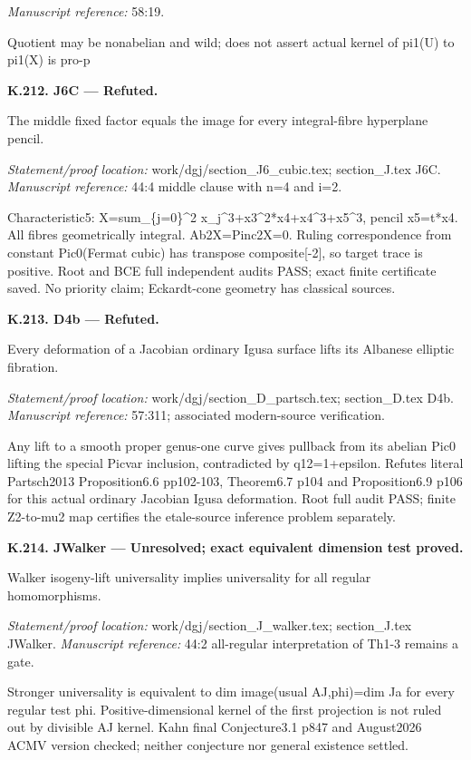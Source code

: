 \emph{Manuscript reference:} 58:19.
\par Quotient may be nonabelian and wild; does not assert actual kernel of pi1(U) to pi1(X) is pro-p
\par\medskip\noindent\textbf{K.212. J6C --- Refuted.}\par
The middle fixed factor equals the image for every integral-fibre hyperplane pencil.
\par\emph{Statement/proof location:} work/dgj/section\_J6\_cubic.tex; section\_J.tex J6C.
\emph{Manuscript reference:} 44:4 middle clause with n=4 and i=2.
\par Characteristic5: X=sum\_\{j=0\}\textasciicircum{}2 x\_j\textasciicircum{}3+x3\textasciicircum{}2*x4+x4\textasciicircum{}3+x5\textasciicircum{}3, pencil x5=t*x4. All fibres geometrically integral. Ab2X=Pinc2X=0. Ruling correspondence from constant Pic0(Fermat cubic) has transpose composite[-2], so target trace is positive. Root and BCE full independent audits PASS; exact finite certificate saved. No priority claim; Eckardt-cone geometry has classical sources.
\par\medskip\noindent\textbf{K.213. D4b --- Refuted.}\par
Every deformation of a Jacobian ordinary Igusa surface lifts its Albanese elliptic fibration.
\par\emph{Statement/proof location:} work/dgj/section\_D\_partsch.tex; section\_D.tex D4b.
\emph{Manuscript reference:} 57:311; associated modern-source verification.
\par Any lift to a smooth proper genus-one curve gives pullback from its abelian Pic0 lifting the special Picvar inclusion, contradicted by q12=1+epsilon. Refutes literal Partsch2013 Proposition6.6 pp102-103, Theorem6.7 p104 and Proposition6.9 p106 for this actual ordinary Jacobian Igusa deformation. Root full audit PASS; finite Z2-to-mu2 map certifies the etale-source inference problem separately.
\par\medskip\noindent\textbf{K.214. JWalker --- Unresolved; exact equivalent dimension test proved.}\par
Walker isogeny-lift universality implies universality for all regular homomorphisms.
\par\emph{Statement/proof location:} work/dgj/section\_J\_walker.tex; section\_J.tex JWalker.
\emph{Manuscript reference:} 44:2 all-regular interpretation of Th1-3 remains a gate.
\par Stronger universality is equivalent to dim image(usual AJ,phi)=dim Ja for every regular test phi. Positive-dimensional kernel of the first projection is not ruled out by divisible AJ kernel. Kahn final Conjecture3.1 p847 and August2026 ACMV version checked; neither conjecture nor general existence settled.

